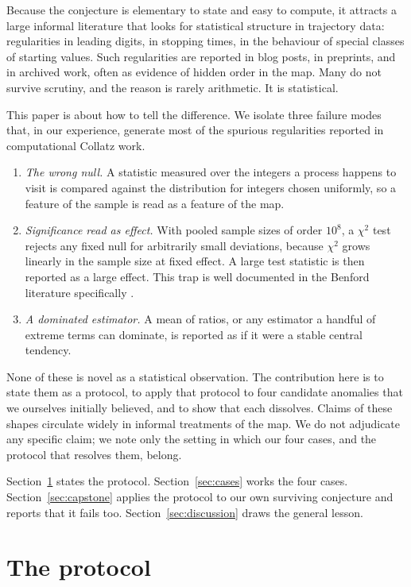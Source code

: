 \documentclass[11pt]{amsart}
\begin{document}
Because the conjecture is elementary to state and easy to compute, it attracts a large informal literature that looks for statistical structure in trajectory data: regularities in leading digits, in stopping times, in the behaviour of special classes of starting values. Such regularities are reported in blog posts, in preprints, and in archived work, often as evidence of hidden order in the map. Many do not survive scrutiny, and the reason is rarely arithmetic. It is statistical.

This paper is about how to tell the difference. We isolate three failure modes that, in our experience, generate most of the spurious regularities reported in computational Collatz work.
\begin{enumerate}
\item \emph{The wrong null.} A statistic measured over the integers a process happens to visit is compared against the distribution for integers chosen uniformly, so a feature of the sample is read as a feature of the map.
\item \emph{Significance read as effect.} With pooled sample sizes of order $10^8$, a $\chi^2$ test rejects any fixed null for arbitrarily small deviations, because $\chi^2$ grows linearly in the sample size at fixed effect. A large test statistic is then reported as a large effect. This trap is well documented in the Benford literature specifically \cite{cerqueti2023, kossovsky2021}.
\item \emph{A dominated estimator.} A mean of ratios, or any estimator a handful of extreme terms can dominate, is reported as if it were a stable central tendency.
\end{enumerate}
None of these is novel as a statistical observation. The contribution here is to state them as a protocol, to apply that protocol to four candidate anomalies that we ourselves initially believed, and to show that each dissolves. Claims of these shapes circulate widely in informal treatments of the map. We do not adjudicate any specific claim; we note only the setting in which our four cases, and the protocol that resolves them, belong.

Section~\ref{sec:protocol} states the protocol. Section~\ref{sec:cases} works the four cases. Section~\ref{sec:capstone} applies the protocol to our own surviving conjecture and reports that it fails too. Section~\ref{sec:discussion} draws the general lesson.

\section{The protocol}\label{sec:protocol}
\end{document}
